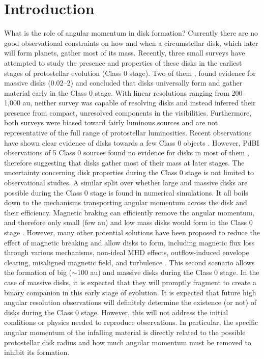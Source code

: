\section{Introduction}

What is the role of angular momentum in disk formation?
Currently there are no good observational constraints on how and when a circumstellar disk, which later will form planets, gather most of its mass. 
Recently, three small surveys have attempted to study the presence and properties of these disks in the earliest stages of protostellar evolution (Class 0 stage). 
Two of them \citep{J_rgensen_2009,Enoch_2011}, found evidence for massive disks (0.02--2\msun) and concluded that disks universally form and gather material early in the Class 0 stage. With linear resolutions ranging from 200--1,000 au, neither survey was capable of resolving disks and instead inferred their presence from compact, unresolved components in the visibilities. 
Furthermore, both surveys were biased toward fairly luminous sources and are not representative of the full range of protostellar luminosities. 
Recent observations have shown clear evidence of disks towards a few Class 0 objects \citep{Murillo_2013,Ohashi_2014}. 
However, PdBI observations of 5 Class 0 sources found no evidence for disks in most of them \citep{Maury_2010}, 
therefore suggesting that disks gather most of their mass at later stages.
The uncertainty concerning disk properties during the Class 0 stage is not limited to observational studies. 
A similar split over whether large and massive disks are possible during the Class 0 stage is found in numerical simulations. 
It all boils down to the mechanisms transporting angular momentum across the disk and their efficiency. 
Magnetic braking can efficiently remove the angular momentum, and therefore only small (few au) and low mass disks would form in the Class 0 stage \citep{Allen_2003,Hennebelle_2008,Mellon_2008,Seifried_2011}. 
However, many other potential solutions have been proposed to reduce the effect of magnetic breaking and allow disks to form, including magnetic flux loss through various mechanisms, non-ideal MHD effects, outflow-induced envelope clearing, misaligned magnetic field, and turbulence \citep{Mellon_08,Li_2011,Seifried_2012}. 
This second scenario allows the formation of big ($\sim$100 au) and massive disks during the Class 0 stage. 
In the case of massive disks, it is expected that they will promptly fragment to create a binary companion in this early stage of evolution.
It is expected that future high angular resolution observations will definitely determine the existence (or not) of disks during the Class 0 stage. 
However, this will not address the initial conditions or physics needed to reproduce observations. 
In particular, the specific angular momentum of the infalling material is directly related to the possible protostellar disk radius  and how much angular momentum must be removed to inhibit its formation.


